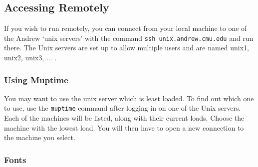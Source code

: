 \documentclass{article}
\begin{document}
\subsection{Accessing {\ETPS} Remotely}

If you wish to run {\ETPS} remotely, you can connect 
from your local machine to one of the Andrew `unix servers' 
with the command \newline
{\tt ssh unix.andrew.cmu.edu}\newline
and run {\ETPS} there. The Unix servers are set up to allow multiple
users and are named unix1, unix2, unix3, ... .

\subsubsection{Using Muptime}

You may want to use the unix server which is least loaded.  To find
out which one to use, use the {\tt muptime} command after logging in
on one of the Unix servers.  Each of the machines will be listed,
along with their current loads.  Choose the machine with the lowest
load.  You will then have to open a new connection to the machine you
select.

\begin{comment}
\subsubsection{An Alternative to etps.cshrc}

If you will be connecting to an Andrew workstation from another
machine, you may find
that the xset command in etps.cshrc causes confusion for the local
machine, resulting in error messages. In this case, you can source\newline
/afs/andrew.cmu.edu/mcs/math/etps/etps-no-xset.cshrc\newline
instead of\newline
/afs/andrew.cmu.edu/mcs/math/etps/etps.cshrc\newline
in your $\sim$/.cshrc file on Andrew.
In this case, your font path will not automatically contain the {\ETPS}
fonts when you do log on to an Andrew workstation, but
an alias {\tt get-etps-fonts} is defined in etps-no-xset.cshrc,
so you can simply issue the command {\tt get-etps-fonts} when you log
onto an Andrew workstation to run {\ETPS}.

\end{comment}

\subsubsection{Fonts}
\end{document}
